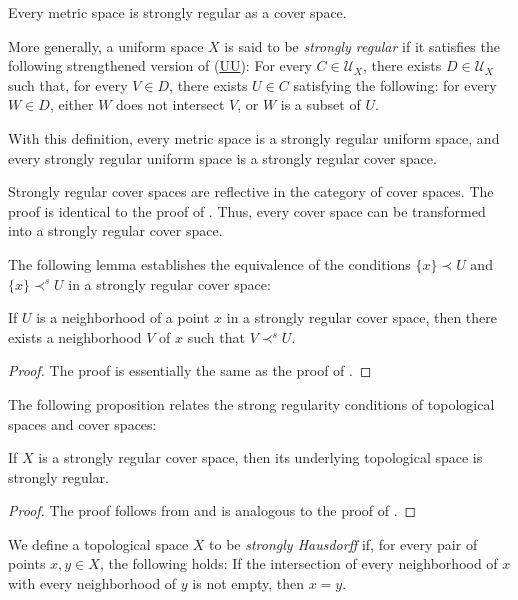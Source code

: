 \documentclass[reqno]{amsart}
\newcommand{\axref}[1]{(\hyperref[ax:#1]{#1})}
\theoremstyle{definition}
\theoremstyle{remark}
\numberwithin{figure}{section}
\newcommand{\rb}{\prec}
\begin{document}
\begin{example}
Every metric space is strongly regular as a cover space.
\end{example}

\begin{example}
More generally, a uniform space $X$ is said to be \emph{strongly regular} if it satisfies the following strengthened version of \axref{UU}:
For every $C \in \mathcal{U}_X$, there exists $D \in \mathcal{U}_X$ such that, for every $V \in D$,
there exists $U \in C$ satisfying the following: for every $W \in D$, either $W$ does not intersect $V$, or $W$ is a subset of $U$.

With this definition, every metric space is a strongly regular uniform space, and every strongly regular uniform space is a strongly regular cover space.
\end{example}

\begin{example}
Strongly regular cover spaces are reflective in the category of cover spaces.
The proof is identical to the proof of .
Thus, every cover space can be transformed into a strongly regular cover space.
\end{example}

The following lemma establishes the equivalence of the conditions $\{ x \} \rb U$ and $\{ x \} \rb^s U$ in a strongly regular cover space:

\begin{lem}
If $U$ is a neighborhood of a point $x$ in a strongly regular cover space, then there exists a neighborhood $V$ of $x$ such that $V \rb^s U$.
\end{lem}
\begin{proof}
The proof is essentially the same as the proof of .
\end{proof}

The following proposition relates the strong regularity conditions of topological spaces and cover spaces:

\begin{prop}
If $X$ is a strongly regular cover space, then its underlying topological space is strongly regular.
\end{prop}
\begin{proof}
The proof follows from  and is analogous to the proof of .
\end{proof}

We define a topological space $X$ to be \emph{strongly Hausdorff} if, for every pair of points $x,y \in X$, the following holds:
If the intersection of every neighborhood of $x$ with every neighborhood of $y$ is not empty, then $x = y$.
\end{document}
